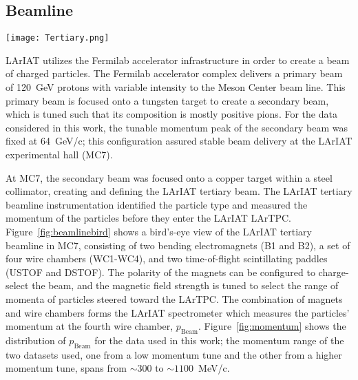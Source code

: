 \documentclass[%
 floatfix,
 reprint,
 twocolumn,
superscriptaddress,
showpacs,preprintnumbers,
 amsmath,amssymb,
 aps,
prd,
]{revtex4-1}
\begin{document}
\subsection{\label{sec:Beamline}Beamline} 
\begin{figure*}
\texttt{[image: Tertiary.png]}
\caption{Bird's eye view of the LArIAT tertiary beamline. USCOLL and DSCOLL represent the upstream and downstream collimators respectively; B1 and B2 represent the bending magnets; WC1, WC2, WC3 and WC4 are the multi-wire proportional chambers; USTOF and DSTOF represent the upstream and downstream time-of-flight scintillators; HALO represents a scintillator paddle with a central hole to enable vetoes of particles with trajectories incompatible with the beamline path; TPC shows the technical drawing of the cryostat which surrounds the liquid argon time projection chamber.}
\label{fig:beamlinebird}
\end{figure*}

LArIAT utilizes the Fermilab accelerator infrastructure in order to create a beam of charged particles.  The Fermilab accelerator complex  delivers a  primary beam of 120~GeV protons with variable intensity to the Meson Center beam line. This primary beam is focused onto a tungsten target to create a secondary beam, which is tuned such that its composition is mostly positive pions. For the data considered in this work, the tunable momentum peak of the secondary beam was fixed at 64~GeV/c; this configuration assured stable beam delivery at the LArIAT experimental hall (MC7).

At MC7, the secondary beam was focused onto a copper target within a steel collimator, creating and defining the LArIAT tertiary beam. The LArIAT tertiary beamline instrumentation identified the particle type and measured the momentum of the particles before they enter the LArIAT LArTPC.
Figure~\ref{fig:beamlinebird} shows a bird’s-eye view of the LArIAT tertiary beamline in MC7, consisting of two bending electromagnets (B1 and B2), a set of four wire chambers (WC1-WC4), and two time-of-flight scintillating paddles (USTOF and DSTOF).  The polarity of the magnets can be configured to charge-select the beam, and the magnetic field strength is tuned to select the range of momenta of particles steered toward the LArTPC. The combination of magnets and wire chambers forms the LArIAT spectrometer which measures the particles' momentum at the fourth wire chamber, $p_{\text{Beam}}$. %
Figure~\ref{fig:momentum} shows the distribution of  $p_{\text{Beam}}$ for the data used in this work; the momentum range of the two datasets used, one from a low momentum tune and the other from a higher momentum tune, spans from $\sim300$ to $\sim1100$~MeV/c.
\end{document}
